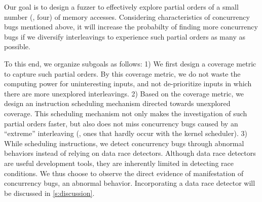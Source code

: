 %
Our goal is to design a fuzzer to effectively explore partial orders
of a small number (\eg, four) of memory accesses.
%
Considering characteristics of concurrency bugs mentioned above, it
will increase the probabilty of finding more concurrency bugs if we
diversify interleavings to experience such partial orders as many as
possible.

To this end, we organize subgoals as follows:
%
1) We first design a coverage metric to capture such partial orders.
By this coverage metric, we do not waste the computing power for
uninteresting inputs, and not de-prioritize inputs in which there are
more unexplored interleavings.
%
2) Based on the coverage metric, we design an instruction scheduling
mechanism directed towards unexplored coverage.
%
This scheduling mechanism not only makes the investigation of such
partial orders faster, but also does not miss concurrency bugs caused
by an ``extreme'' interleaving (\ie, ones that hardly occur with the
kernel scheduler).
%
3) While scheduling instructions, we detect concurrency bugs through
abnormal behaviors instead of relying on data race detectors.
%
Although data race detectors are useful development tools, they are
inherently limited in detecting race conditions.
%
We thus choose to observe the direct evidence of manifestation of
concurrency bugs, an abnormal behavior.
%
Incorporating a data race detector will be discussed in
\autoref{s:discussion}.



